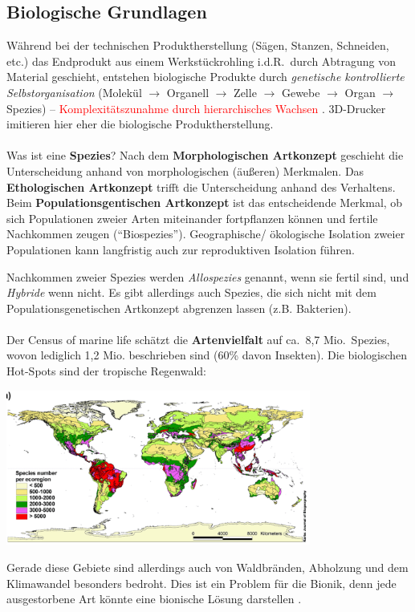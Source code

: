 \subsection{Biologische Grundlagen}
Während bei der technischen Produktherstellung (Sägen, Stanzen, Schneiden, etc.) das Endprodukt aus einem Werkstückrohling i.d.R.\ durch Abtragung von Material geschieht, entstehen biologische Produkte durch \textit{genetische kontrollierte Selbstorganisation} (Molekül $\rightarrow$ Organell $\rightarrow$ Zelle $\rightarrow$ Gewebe $\rightarrow$ Organ $\rightarrow$ Spezies) -- \textcolor{red}{Komplexitätszunahme durch hierarchisches Wachsen} \dangersign. 3D-Drucker imitieren hier eher die biologische Produktherstellung.
\\
\\
Was ist eine \textbf{Spezies}? Nach dem \textbf{Morphologischen Artkonzept} geschieht die Unterscheidung anhand von morphologischen (äußeren) Merkmalen. Das \textbf{Ethologischen Artkonzept} trifft die Unterscheidung anhand des Verhaltens. Beim \textbf{Populationsgentischen Artkonzept} ist das entscheidende Merkmal, ob sich Populationen zweier Arten miteinander fortpflanzen können und fertile Nachkommen zeugen (``Biospezies''). Geographische/ ökologische Isolation zweier Populationen kann langfristig auch zur reproduktiven Isolation führen. 

Nachkommen zweier Spezies werden \textit{Allospezies} genannt, wenn sie fertil sind, und \textit{Hybride} wenn nicht. Es gibt allerdings auch Spezies, die sich nicht mit dem Populationsgenetischen Artkonzept abgrenzen lassen (z.B. Bakterien).
\\
\\
Der Census of marine life schätzt die \textbf{Artenvielfalt} auf ca.\ 8,7 Mio.\ Spezies, wovon lediglich 1,2 Mio. beschrieben sind (60\% davon Insekten). Die biologischen Hot-Spots sind der tropische Regenwald:

\begin{center}
	\includegraphics[width=10cm]{lec1/figures/bio-hotspots.png}
\end{center} 
Gerade diese Gebiete sind allerdings auch von Waldbränden, Abholzung und dem Klimawandel besonders bedroht. Dies ist ein Problem für die Bionik, denn jede ausgestorbene Art könnte eine bionische Lösung darstellen \dangersign.

